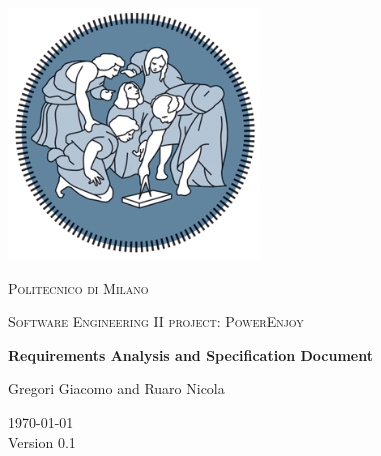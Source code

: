 \documentclass[openright]{report}
\def \version {0.1}
\begin{document}
	\begin{titlepage}
		\centering
		\includegraphics[width=0.50\textwidth]{polimi}\\\vspace{0.25cm}
		{\scshape\LARGE Politecnico di Milano\par}\vspace{0.25cm}
		{\scshape\Large Software Engineering II project: PowerEnjoy\par}\vspace{1.5cm}
		{\huge\bfseries Requirements Analysis and Specification Document\par}\vspace{1cm}
		{\large Gregori Giacomo and Ruaro Nicola\par}\vfill

		{\large \today \\Version \version}
	\end{titlepage}


    \tableofcontents

    \begin{abstract}
		The main purpose of this document is to give a specification of the requirements that our system has to fulfill adopting the IEEE-830 standard for RASD documentation. 
		It also introduces functional and non-functional requirements via high level specification of the system. 
		In the last part a formal model is presented using Alloy. 
		\\The information contained in this document is intended for the stakeholders and developers: for the stakeholders this document presents an useful description to understand the project development, meanwhile for the developers it’s quite a comfortable way to match the stakeholders' requests and the proposed solutions.
	\end{abstract}
\end{document}
